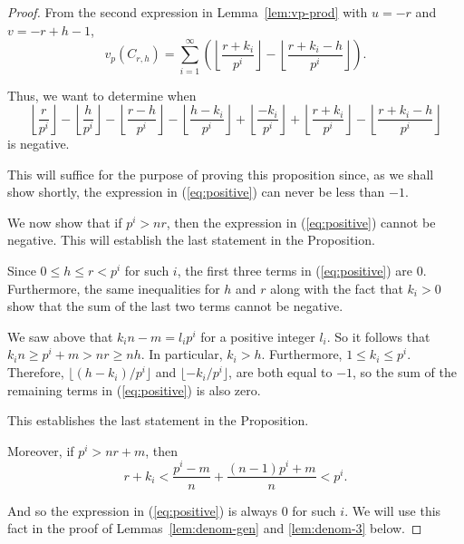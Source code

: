 \documentclass{jT}
\theoremstyle{definition}
\begin{document}
\begin{proof}
From the second expression in Lemma~\ref{lem:vp-prod} with $u=-r$ and $v=-r+h-1$,
\begin{displaymath}
v_{p} \left( C_{r,h} \right) 
= \sum_{i=1}^{\infty} 
  \left( \left\lfloor \frac{r+k_{i}}{p^{i}} \right\rfloor
         - \left\lfloor \frac{r+k_{i}-h}{p^{i}} \right\rfloor \right).
\end{displaymath}

Thus, we want to determine when 
\begin{equation}
\label{eq:positive}
\left\lfloor \frac{r}{p^{i}} \right\rfloor - \left\lfloor \frac{h}{p^{i}} \right\rfloor 
- \left\lfloor \frac{r-h}{p^{i}} \right\rfloor
- \left\lfloor \frac{h-k_{i}}{p^{i}} \right\rfloor + \left\lfloor \frac{-k_{i}}{p^{i}} \right\rfloor 
+ \left\lfloor \frac{r+k_{i}}{p^{i}} \right\rfloor - \left\lfloor \frac{r+k_{i}-h}{p^{i}} \right\rfloor 
\end{equation}
is negative.

This will suffice for the purpose of proving this proposition since, as we shall
show shortly, the expression in (\ref{eq:positive}) can never be less than $-1$. 

We now show that if $p^{i} > nr$, then the expression in (\ref{eq:positive})
cannot be negative. This will establish the last statement in the Proposition.

Since $0 \leq h \leq r < p^{i}$ for such $i$, the first three terms in
(\ref{eq:positive}) are 0. Furthermore, the same inequalities for $h$
and $r$ along with the fact that $k_{i} > 0$ show that the sum of the
last two terms cannot be negative.

We saw above that $k_{i}n-m=l_{i}p^{i}$ for a positive integer $l_{i}$.
So it follows that $k_{i}n \geq p^{i}+m > nr \geq nh$. In particular,
$k_{i} > h$. Furthermore, $1 \leq k_{i} \leq p^{i}$. Therefore,
$\lfloor (h-k_{i})/p^{i} \rfloor$ and $\lfloor -k_{i}/p^{i} \rfloor$, are both
equal to $-1$, so the sum of the remaining terms in (\ref{eq:positive})
is also zero.

This establishes the last statement in the Proposition.

Moreover, if $p^{i}>nr+m$, then
\begin{displaymath}
r+k_{i} < \frac{p^{i}-m}{n}+ \frac{(n-1)p^{i}+m}{n} < p^{i}.
\end{displaymath}

And so the expression in (\ref{eq:positive}) is always 0 for such $i$.
We will use this fact in the proof of Lemmas~\ref{lem:denom-gen}
and \ref{lem:denom-3} below.


\end{proof}
\end{document}
